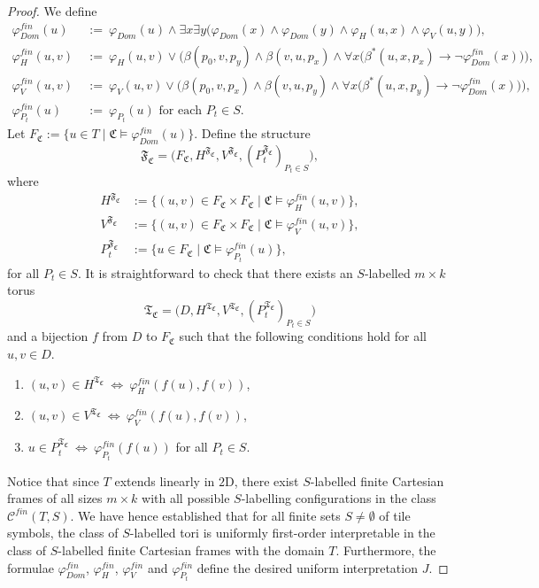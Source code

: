 \documentclass{LMCS}
\theoremstyle{plain}
\newcommand{\mf}{\mathfrak}
\newcommand{\mi}{\mathit}
\begin{document}
\begin{proof}
%
We define
%
\begin{align*}
%
\varphi^{\mi{fin}}_{\mi{Dom}}(u)&\ :=\ \varphi_{\mi{Dom}}(u)\wedge \exists x\exists
%
y\bigl(\varphi_{\mi{Dom}}(x)\wedge \varphi_{\mi{Dom}}(y)\wedge \varphi_H(u,x)\wedge \varphi_V(u,y)  \bigr),\\
%
\varphi^{\mi{fin}}_H(u,v)&\ :=\ \varphi_H(u,v)
%
\vee\Big(\beta(p_0,v,p_y)\wedge\beta(v,u,p_x)\wedge
%
\forall x\big(\beta^*(u,x,p_x)\rightarrow\neg\varphi_{\mi{Dom}}^{\mi{fin}}(x)\big)\Big),\\
%
\varphi^{\mi{fin}}_V(u,v)&\ :=\ \varphi_V(u,v)
\vee\Big(\beta(p_0,v,p_x)\wedge\beta(v,u,p_y)\wedge
%
\forall x\big(\beta^*(u,x,p_y)\rightarrow\neg\varphi_{\mi{Dom}}^{\mi{fin}}(x)\big)\Big),\\
%
\varphi^\mi{fin}_{P_t}(u)&\ :=\ \varphi_{P_t}(u)\text{ for each }P_t\in S.
\end{align*}
Let $F_\mf{C}:=\{u\in T \mid \mf{C}\models \varphi^{\mi{fin}}_{Dom}(u)\}$. Define the structure
%
%
%
$$\mf{F}_\mf{C}=\bigl(F_\mf{C},H^{\mf{F}_\mf{C}},V^{\mf{F}_\mf{C}}, (P_t^{\mf{F}_\mf{C}})_{P_t\in S}\bigr),$$
%
%
%
where
%
%
%
\begin{align*}
H^{\mf{F}_\mf{C}}&:=\{(u,v)\in F_\mf{C}\times F_\mf{C}\mid \mf{C}\models \varphi^{\mi{fin}}_H(u,v)\}, \\
V^{\mf{F}_\mf{C}}&:=\{(u,v)\in F_\mf{C}\times F_\mf{C}\mid \mf{C}\models \varphi^{\mi{fin}}_V(u,v)\}, \\
P_t^{\mf{F}_\mf{C}}&:=\{u\in F_\mf{C}\mid \mf{C}\models \varphi^\mi{fin}_{P_t}(u)\},
\end{align*}
for all $P_t\in S$.
It is straightforward to check that there exists an $S$-labelled $m\times k$ torus
\[ \mf{T}_{\mf{C}}=\bigl(D,H^{\mf{T}_\mf{C}},V^{\mf{T}_\mf{C}}, (P_t^{\mf{T}_\mf{C}})_{P_t\in S}\bigr)
\]
and a bijection $f$ from $D$ to $F_\mf{C}$ such that the following conditions hold for all $u,v\in D$.
\begin{enumerate}
\item $(u,v)\in H^{\mf{T}_\mf{C}}\ \Leftrightarrow\ \varphi^{\mi{fin}}_H(f(u),f(v))$,
\vspace{1pt}
\item $(u,v)\in V^{\mf{T}_\mf{C}}\ \Leftrightarrow\ \varphi^{\mi{fin}}_V(f(u),f(v))$,
\vspace{1pt}
\item $u\in P_t^{\mf{T}_\mf{C}}\ \Leftrightarrow\ \varphi^\mi{fin}_{P_t}(f(u))$ for all $P_t\in S$.
\end{enumerate}
Notice that since $T$ extends linearly in $\mathrm{2D}$, there exist $S$-labelled finite Cartesian frames of all sizes $m\times k$
%
with all possible $S$-labelling configurations in the class
%
$\mathcal{C}^{\mi{fin}}(T,S)$.
%
We have hence established that for all finite sets $S\not=\emptyset$ of tile symbols,
%
the class of $S$-labelled tori is uniformly first-order interpretable in the class of $S$-labelled finite Cartesian frames
%
 with the domain $T$. Furthermore, the
%
formulae $\varphi_{\mi{Dom}}^\mi{fin}$, $\varphi_H^\mi{fin}$, $\varphi_V^\mi{fin}$ and $\varphi_{P_t}^\mi{fin}$
%
define the desired uniform interpretation $J$.
%
\end{proof}
\end{document}
